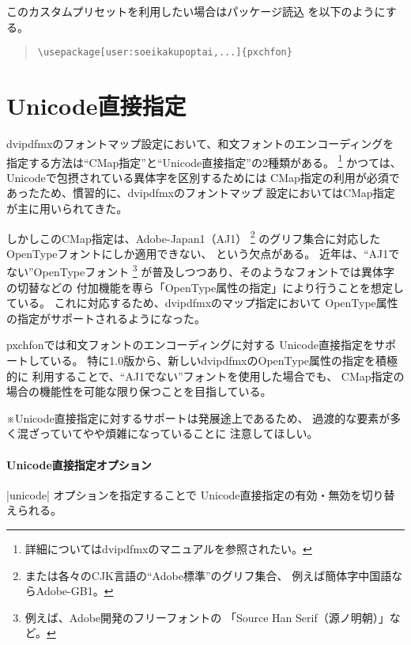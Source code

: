 \documentclass[uplatex,dvipdfmx,a4paper]{jsarticle}
\newcommand{\Pkg}[1]{\textsf{#1}}
\newcommand{\Note}{\par\noindent ※}
\begin{document}
このカスタムプリセットを利用したい場合はパッケージ読込
を以下のようにする。
\begin{quote}\small\begin{verbatim}                                      
\usepackage[user:soeikakupoptai,...]{pxchfon}
\end{verbatim}\end{quote}


\section{Unicode直接指定}
\label{sec:DirectUnicode}

dvipdfmxのフォントマップ設定において、和文フォントのエンコーディングを
指定する方法は“CMap指定”と“Unicode直接指定”の2種類がある。
\footnote{詳細についてはdvipdfmxのマニュアルを参照されたい。}
かつては、Unicodeで包摂されている異体字を区別するためには
CMap指定の利用が必須であったため、慣習的に、dvipdfmxのフォントマップ
設定においてはCMap指定が主に用いられてきた。

しかしこのCMap指定は、Adobe-Japan1（AJ1）%
\footnote{または各々のCJK言語の“Adobe標準”のグリフ集合、
例えば簡体字中国語ならAdobe-GB1。}%
のグリフ集合に対応したOpenTypeフォントにしか適用できない、
という欠点がある。
近年は、“AJ1でない”OpenTypeフォント
\footnote{例えば、Adobe開発のフリーフォントの
「Source Han Serif（源ノ明朝）」など。}%
が普及しつつあり、そのようなフォントでは異体字の切替などの
付加機能を専ら「OpenType属性の指定」により行うことを想定している。
これに対応するため、dvipdfmxのマップ指定において
OpenType属性の指定がサポートされるようになった。

\Pkg{pxchfon}では和文フォントのエンコーディングに対する
Unicode直接指定をサポートしている。
特に1.0版から、新しいdvipdfmxのOpenType属性の指定を積極的に
利用することで、“AJ1でない”フォントを使用した場合でも、
CMap指定の場合の機能性を可能な限り保つことを目指している。

\Note Unicode直接指定に対するサポートは発展途上であるため、
過渡的な要素が多く混ざっていてやや煩雑になっていることに
注意してほしい。

\paragraph{Unicode直接指定オプション}
|unicode| オプションを指定することで
Unicode直接指定の有効・無効を切り替えられる。
\end{document}

